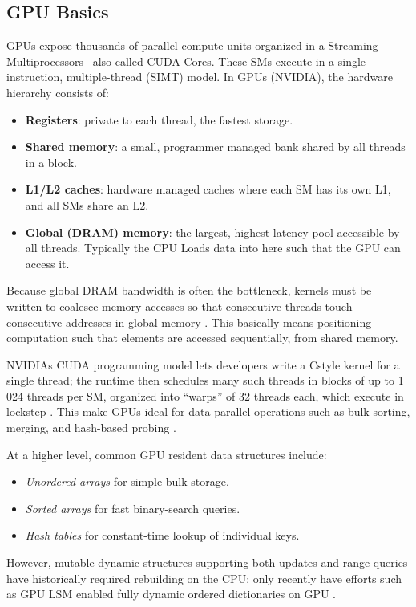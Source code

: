 \documentclass[sigconf]{acmart}
\begin{document}
      \subsection{GPU Basics}
        GPUs expose thousands of parallel compute units organized in a Streaming Multiprocessors-- also called CUDA Cores. These SMs execute in a single-instruction, multiple-thread (SIMT) model.  In GPUs (NVIDIA), the hardware hierarchy consists of:
        \begin{itemize}
          \item \textbf{Registers}: private to each thread, the fastest storage.
          \item \textbf{Shared memory}: a small, programmer managed bank shared by all threads in a block.
          \item \textbf{L1/L2 caches}: hardware managed caches where each SM has its own L1, and all SMs share an L2.
          \item \textbf{Global (DRAM) memory}: the largest, highest latency pool accessible by all threads. Typically the CPU Loads data into here such that the GPU can access it.
        \end{itemize}
        Because global DRAM bandwidth is often the bottleneck, kernels must be written to coalesce memory accesses so that consecutive threads touch consecutive addresses in global memory \cite{ashkiani2018gpu}. This basically means positioning computation such that elements are accessed sequentially, from shared memory.

        NVIDIAs CUDA programming model lets developers write a Cstyle kernel for a single thread; the runtime then schedules many such threads in blocks of up to 1\,024 threads per SM, organized into “warps” of 32 threads each, which execute in lockstep \cite{ashkiani2018gpu}.  This make GPUs ideal for data-parallel operations such as bulk sorting, merging, and hash-based probing \cite{ashkiani2018gpu, zhou2024gpuaccel}.

        At a higher level, common GPU resident data structures include:
        \begin{itemize}
          \item \emph{Unordered arrays} for simple bulk storage.
          \item \emph{Sorted arrays} for fast binary-search queries.
          \item \emph{Hash tables} for constant-time lookup of individual keys.
        \end{itemize}
        However, mutable dynamic structures supporting both updates and range queries have historically required rebuilding on the CPU; only recently have efforts such as GPU LSM enabled fully dynamic ordered dictionaries on GPU \cite{ashkiani2018gpu}.
\end{document}
